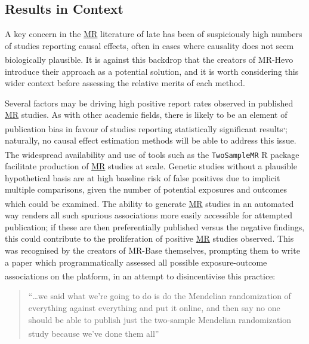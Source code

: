 \documentclass[
]{article}
\begin{document}
\subsection{Results in Context}\label{results-in-context}

A key concern in the \hyperref[acronyms_MR]{MR} literature of late has been of suspiciously high numbers of studies reporting causal effects, often in cases where causality does not seem biologically plausible\textsuperscript{}. It is against this backdrop that the creators of MR-Hevo introduce their approach as a potential solution, and it is worth considering this wider context before assessing the relative merits of each method.

Several factors may be driving high positive report rates observed in published \hyperref[acronyms_MR]{MR} studies. As with other academic fields, there is likely to be an element of publication bias in favour of studies reporting statistically significant results\textsuperscript{,}; naturally, no causal effect estimation methods will be able to address this issue. The widespread availability and use of tools such as the \texttt{TwoSampleMR} R package\textsuperscript{} facilitate production of \hyperref[acronyms_MR]{MR} studies at scale. Genetic studies without a plausible hypothetical basis are at high baseline risk of false positives due to implicit multiple comparisons, given the number of potential exposures and outcomes which could be examined\textsuperscript{}. The ability to generate \hyperref[acronyms_MR]{MR} studies in an automated way renders all such spurious associations more easily accessible for attempted publication; if these are then preferentially published versus the negative findings, this could contribute to the proliferation of positive \hyperref[acronyms_MR]{MR} studies observed. This was recognised by the creators of MR-Base themselves, prompting them to write a paper which programmatically assessed all possible exposure-outcome associations on the platform, in an attempt to disincentivise this practice\textsuperscript{}:

\begin{quote}
``\ldots we said what we're going to do is do the Mendelian randomization of everything against everything and put it online, and then say no one should be able to publish just the two-sample Mendelian randomization study because we've done them all''\textsuperscript{}
\end{quote}
\end{document}
